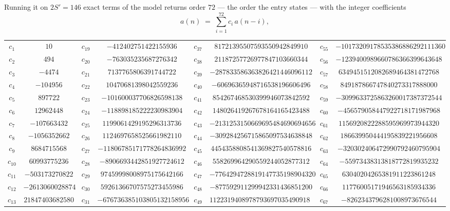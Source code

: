 \documentclass[11pt,a4paper]{article}
\theoremstyle{plain}
\theoremstyle{definition}
\begin{document}
Running it on $2S'=146$ exact terms of the model returns order $72$ --- the order the
entry states --- with the integer coefficients
\[
a(n)\;=\;\sum_{i=1}^{72}c_i\,a(n-i),
\]
\begin{center}\small
\begin{tabular}{cccccccc}
$c_{1}$ & $10$ & $c_{19}$ & $-412402751422155936$ & $c_{37}$ & $81721395507593550942849910$ & $c_{55}$ & $-10173209178535386886292111360$ \\
$c_{2}$ & $494$ & $c_{20}$ & $-763035235687276342$ & $c_{38}$ & $21187257726977847103660344$ & $c_{56}$ & $-1239400989660786366399643648$ \\
$c_{3}$ & $-4474$ & $c_{21}$ & $7137765806391744722$ & $c_{39}$ & $-287833586363826421446096112$ & $c_{57}$ & $6349451512082689464381472768$ \\
$c_{4}$ & $-104956$ & $c_{22}$ & $10470681398042559236$ & $c_{40}$ & $-60696365948716538196606496$ & $c_{58}$ & $849187866747840273317888000$ \\
$c_{5}$ & $897722$ & $c_{23}$ & $-101600037706826598138$ & $c_{41}$ & $854267468530399946073842592$ & $c_{59}$ & $-3099633725863260017387372544$ \\
$c_{6}$ & $12962448$ & $c_{24}$ & $-118898185222230983904$ & $c_{42}$ & $148026419267678164165423488$ & $c_{60}$ & $-456579058447922718171987968$ \\
$c_{7}$ & $-107663432$ & $c_{25}$ & $1199061429195296313736$ & $c_{43}$ & $-2131253150669695484690694656$ & $c_{61}$ & $1156920822288595969973944320$ \\
$c_{8}$ & $-1056352662$ & $c_{26}$ & $1124697658525661982110$ & $c_{44}$ & $-309284256715865097534638848$ & $c_{62}$ & $186639950444195839221956608$ \\
$c_{9}$ & $8684715568$ & $c_{27}$ & $-11806785171778264836992$ & $c_{45}$ & $4454358808541369827540578816$ & $c_{63}$ & $-320302406472990792460795904$ \\
$c_{10}$ & $60993775236$ & $c_{28}$ & $-8906693442851927724612$ & $c_{46}$ & $558269964290559244052877312$ & $c_{64}$ & $-55973438313818772819935232$ \\
$c_{11}$ & $-503173270822$ & $c_{29}$ & $97459998008975175642166$ & $c_{47}$ & $-7764294728819147735198904320$ & $c_{65}$ & $63040204265381911223861248$ \\
$c_{12}$ & $-2613060028874$ & $c_{30}$ & $59261366707575273455986$ & $c_{48}$ & $-877592911299942331436851200$ & $c_{66}$ & $11776005171946563185934336$ \\
$c_{13}$ & $21847403682580$ & $c_{31}$ & $-676736385103805132158956$ & $c_{49}$ & $11223194089787936970354909184$ & $c_{67}$ & $-8262343796281008973676544$ \\

\end{tabular}
\end{center}
\end{document}
